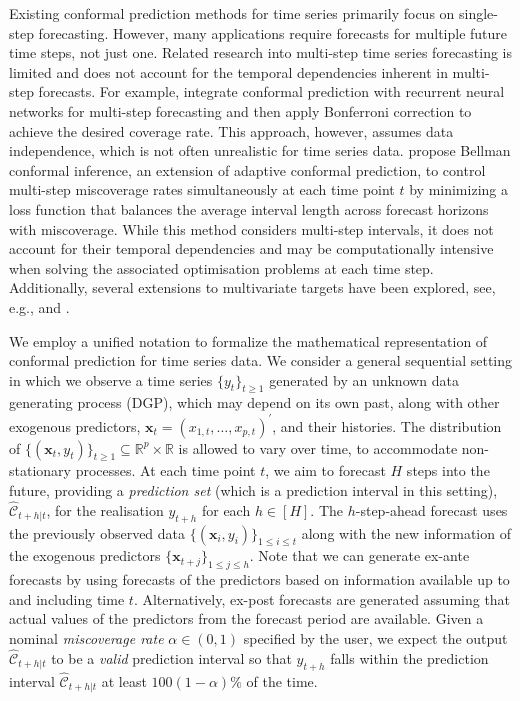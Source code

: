 \documentclass[
  11pt,
  12pt]{article}
\theoremstyle{plain}
\theoremstyle{remark}
\begin{document}
Existing conformal prediction methods for time series primarily focus on
single-step forecasting. However, many applications require forecasts
for multiple future time steps, not just one. Related research into
multi-step time series forecasting is limited and does not account for
the temporal dependencies inherent in multi-step forecasts. For example,
\citet{stankeviciute2021} integrate conformal prediction with recurrent
neural networks for multi-step forecasting and then apply Bonferroni
correction to achieve the desired coverage rate. This approach, however,
assumes data independence, which is not often unrealistic for time
series data. \citet{yang2024ts} propose Bellman conformal inference, an
extension of adaptive conformal prediction, to control multi-step
miscoverage rates simultaneously at each time point \(t\) by minimizing
a loss function that balances the average interval length across
forecast horizons with miscoverage. While this method considers
multi-step intervals, it does not account for their temporal
dependencies and may be computationally intensive when solving the
associated optimisation problems at each time step. Additionally,
several extensions to multivariate targets have been explored, see,
e.g., \citet{schlembach2022} and \citet{sun2022}.

We employ a unified notation to formalize the mathematical
representation of conformal prediction for time series data. We consider
a general sequential setting in which we observe a time series
\(\{y_t\}_{t \geq 1}\) generated by an unknown data generating process
(DGP), which may depend on its own past, along with other exogenous
predictors, \(\bm{x}_t=(x_{1,t},\ldots,x_{p,t})^{\prime}\), and their
histories. The distribution of
\(\{(\bm{x}_t, y_t)\}_{t \geq 1} \subseteq \mathbb{R}^p \times \mathbb{R}\)
is allowed to vary over time, to accommodate non-stationary processes.
At each time point \(t\), we aim to forecast \(H\) steps into the
future, providing a \emph{prediction set} (which is a prediction
interval in this setting), \(\hat{\mathcal{C}}_{t+h|t}\), for the
realisation \(y_{t+h}\) for each \(h\in[H]\). The \(h\)-step-ahead
forecast uses the previously observed data
\(\{(\bm{x}_i, y_i)\}_{1 \leq i \leq t}\) along with the new information
of the exogenous predictors \(\{\bm{x}_{t+j}\}_{1\leq j\leq h}\). Note
that we can generate ex-ante forecasts by using forecasts of the
predictors based on information available up to and including time
\(t\). Alternatively, ex-post forecasts are generated assuming that
actual values of the predictors from the forecast period are available.
Given a nominal \emph{miscoverage rate} \(\alpha \in (0,1)\) specified
by the user, we expect the output \(\hat{\mathcal{C}}_{t+h|t}\) to be a
\emph{valid} prediction interval so that \(y_{t+h}\) falls within the
prediction interval \(\hat{\mathcal{C}}_{t+h|t}\) at least
\(100(1-\alpha)\%\) of the time.
\end{document}
